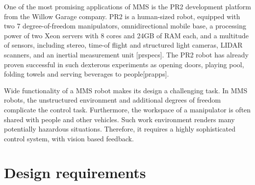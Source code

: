 
One of the most promising applications of MMS is the PR2 development platform from the Willow Garage company. PR2 is a human-sized robot, equipped with two 7 degree-of-freedom manipulators, omnidirectional mobile base, a processing power of two Xeon servers with 8 cores and 24GB of RAM each, and a multitude of sensors, including stereo, time-of flight and structured light cameras, LIDAR scanners, and an inertial measurement unit [prspecs]. The PR2 robot has already proven successful in such dexterous experiments as opening doors, playing pool, folding towels and serving beverages to people[prapps]. 

Wide functionality of a MMS robot makes its design a challenging task. In MMS robots, the unstructured environment and additional degrees of freedom complicate the control task. Furthermore, the workspace of a manipulator is often shared with people and other vehicles. Such work environment renders many potentially hazardous situations. Therefore, it requires a highly sophisticated control system, with vision based feedback. 


\section{Design requirements}
\label{sec:require}

